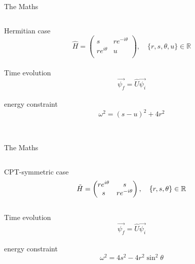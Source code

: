 \documentclass[10pt]{beamer}
\begin{document}
\begin{frame}{The Maths}
\begin{columns}
    \hspace{1.5em}
    \begin{column}{\textwidth}
    \textcolor{myNewColorA}{Hermitian} case
    \hspace{-1.5em}
    \begin{equation*}
    \hat{H}  = \begin{pmatrix}
                s & r e^{-i\theta}  \\
                r e^{i \theta} & u  \\
                \end{pmatrix} , \quad \{r, s, \theta, u\} \in \mathbb{R}
    \end{equation*}\\
    Time evolution
    \hspace{-1.5em}
    \begin{equation*}
    \vec{\psi_f}  = \hat{U} \vec{\psi_i}
    \end{equation*} \\
    energy constraint
    \hspace{-1.5em}
    \begin{equation*}
     \omega^2 = (s-u)^2 + 4r^2
    \end{equation*} \\
    \end{column}
\end{columns}
\end{frame}

\begin{frame}{The Maths}
\begin{columns}
    \hspace{1.5em}
    \begin{column}{\textwidth}
    \textcolor{myNewColorC}{CPT-symmetric} case
    \hspace{-1.5em}
    \begin{equation*}
    \Tilde{H}  = \begin{pmatrix}
                r e^{i\theta} & s  \\
                s & r e^{-i\theta}  \\
                \end{pmatrix}, \quad \{r, s, \theta\} \in \mathbb{R}
    \end{equation*}\\
    Time evolution
    \hspace{-1.5em}
    \begin{equation*}
    \vec{\psi_f}  = \hat{U} \vec{\psi_i}
    \end{equation*} \\
    energy constraint
    \hspace{-1.5em}
    \begin{equation*}
     \omega^2 = 4s^2 - 4r^2 \sin^2{\theta}
    \end{equation*} \\
    \end{column}
\end{columns}
\end{frame}
\end{document}
